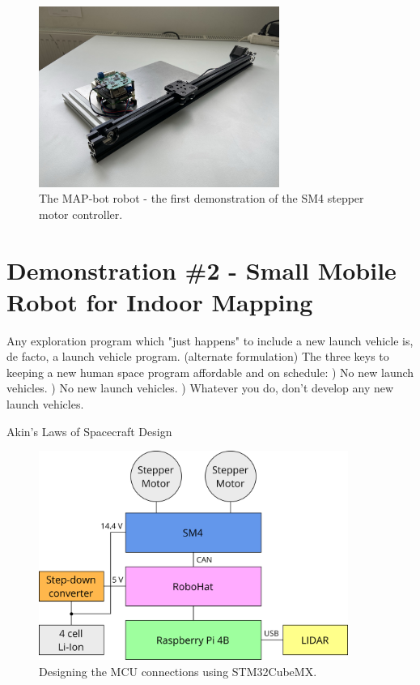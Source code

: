 \begin{figure}[H]
    \centering
    \includegraphics[width=0.7\textwidth]{obrazky/rail}
    \caption{The MAP-bot robot - the first demonstration of the SM4 stepper motor controller.}
    \label{fig:rail_demonstrator}
\end{figure}

\section{Demonstration \#2 - Small Mobile Robot for Indoor Mapping}
\label{sec:dem1}
\epigraph{
    Any exploration program which "just happens" to include a new launch vehicle is, de facto, a launch vehicle program. \newline\newline
    (alternate formulation) The three keys to keeping a new human space program affordable and on schedule: )  No new launch vehicles. )  No new launch vehicles. )  Whatever you do, don't develop any new launch vehicles.}{Akin's Laws of Spacecraft Design\cite{akin_akins_nodate}}

\begin{figure}[H]
    \centering
    \includegraphics[width=0.9\textwidth]{obrazky/mapbot_block_diag}
    \caption{Designing the MCU connections using STM32CubeMX.}
    \label{fig:mapbot_block}
\end{figure}

